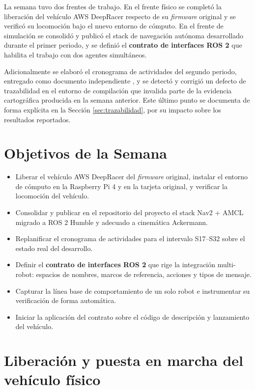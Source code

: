 \documentclass[12pt,letterpaper]{article}
\begin{document}
La semana tuvo dos frentes de trabajo. En el frente físico se completó la liberación del vehículo AWS DeepRacer respecto de su \textit{firmware} original y se verificó su locomoción bajo el nuevo entorno de cómputo. En el frente de simulación se consolidó y publicó el stack de navegación autónoma desarrollado durante el primer periodo, y se definió el \textbf{contrato de interfaces ROS 2} que habilita el trabajo con dos agentes simultáneos.

Adicionalmente se elaboró el cronograma de actividades del segundo periodo, entregado como documento independiente \cite{cronograma}, y se detectó y corrigió un defecto de trazabilidad en el entorno de compilación que invalida parte de la evidencia cartográfica producida en la semana anterior. Este último punto se documenta de forma explícita en la Sección \ref{sec:trazabilidad}, por su impacto sobre los resultados reportados.

\section{Objetivos de la Semana}

\begin{itemize}
    \item Liberar el vehículo AWS DeepRacer del \textit{firmware} original, instalar el entorno de cómputo en la Raspberry Pi 4 y en la tarjeta original, y verificar la locomoción del vehículo.
    \item Consolidar y publicar en el repositorio del proyecto el stack Nav2 + AMCL migrado a ROS 2 Humble y adecuado a cinemática Ackermann.
    \item Replanificar el cronograma de actividades para el intervalo S17--S32 sobre el estado real del desarrollo.
    \item Definir el \textbf{contrato de interfaces ROS 2} que rige la integración multi-robot: espacios de nombres, marcos de referencia, acciones y tipos de mensaje.
    \item Capturar la línea base de comportamiento de un solo robot e instrumentar su verificación de forma automática.
    \item Iniciar la aplicación del contrato sobre el código de descripción y lanzamiento del vehículo.
\end{itemize}

\section{Liberación y puesta en marcha del vehículo físico}
\end{document}

